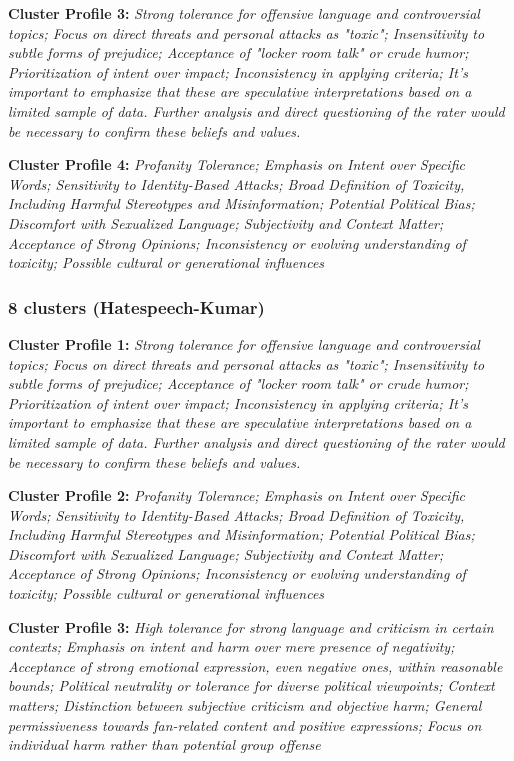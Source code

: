 \documentclass[11pt]{article}
\newcommand{\profiletext}[1]{\textit{#1}}
\begin{document}
\textbf{Cluster Profile 3:} \profiletext{Strong tolerance for offensive language and controversial topics; Focus on direct threats and personal attacks as "toxic"; Insensitivity to subtle forms of prejudice; Acceptance of "locker room talk" or crude humor; Prioritization of intent over impact; Inconsistency in applying criteria; It's important to emphasize that these are speculative interpretations based on a limited sample of data.  Further analysis and direct questioning of the rater would be necessary to confirm these beliefs and values.}

\textbf{Cluster Profile 4:} \profiletext{Profanity Tolerance; Emphasis on Intent over Specific Words; Sensitivity to Identity-Based Attacks; Broad Definition of Toxicity, Including Harmful Stereotypes and Misinformation; Potential Political Bias; Discomfort with Sexualized Language; Subjectivity and Context Matter; Acceptance of Strong Opinions; Inconsistency or evolving understanding of toxicity; Possible cultural or generational influences}

\subsubsection{8 clusters (Hatespeech-Kumar)}

\textbf{Cluster Profile 1:} \profiletext{Strong tolerance for offensive language and controversial topics; Focus on direct threats and personal attacks as "toxic"; Insensitivity to subtle forms of prejudice; Acceptance of "locker room talk" or crude humor; Prioritization of intent over impact; Inconsistency in applying criteria; It's important to emphasize that these are speculative interpretations based on a limited sample of data.  Further analysis and direct questioning of the rater would be necessary to confirm these beliefs and values.}

\textbf{Cluster Profile 2:} \profiletext{Profanity Tolerance; Emphasis on Intent over Specific Words; Sensitivity to Identity-Based Attacks; Broad Definition of Toxicity, Including Harmful Stereotypes and Misinformation; Potential Political Bias; Discomfort with Sexualized Language; Subjectivity and Context Matter; Acceptance of Strong Opinions; Inconsistency or evolving understanding of toxicity; Possible cultural or generational influences}

\textbf{Cluster Profile 3:} \profiletext{High tolerance for strong language and criticism in certain contexts; Emphasis on intent and harm over mere presence of negativity; Acceptance of strong emotional expression, even negative ones, within reasonable bounds; Political neutrality or tolerance for diverse political viewpoints; Context matters; Distinction between subjective criticism and objective harm; General permissiveness towards fan-related content and positive expressions; Focus on individual harm rather than potential group offense}
\end{document}
